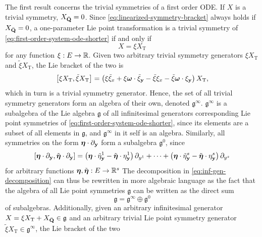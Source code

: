 The first result concerns the trivial symmetries of a first order ODE.
If \(X\) is a trivial symmetry, \(X_{\bar{\vb{Q}}} = 0\).
Since \cref{eq:linearized-symmetry-bracket} always holds if \(X_{\bar{\vb{Q}}} = 0\), a one-parameter Lie point transformation is a trivial symmetry of \cref{eq:first-order-system-ode-shorter} if and only if
\begin{equation}
  X = \xi X_{\text{T}}
\end{equation}
for any function \(\xi: E \to \mathbb{R}\).
Given two arbitrary trivial symmetry generators \(\xi X_{\text{T}}\) and \(\tilde{\xi} X_{\text{T}}\), the Lie bracket of the two is
\begin{equation}
  \comm{\xi X_{\text{T}}}{\tilde{\xi} X_{\text{T}}} = \left(\xi \tilde{\xi}_x + \xi \vb*{\omega} \cdot \tilde{\xi}_{\vb{y}} - \tilde{\xi} \xi_x - \tilde{\xi} \vb*{\omega} \cdot \xi_{\vb{y}} \right) X_{\text{T}},
\end{equation}
which in turn is a trivial symmetry generator.
Hence, the set of all trivial symmetry generators form an algebra of their own, denoted \(\mathfrak{g}^\infty\).
\(\mathfrak{g}^\infty\) is a subalgebra of the Lie algebra \(\mathfrak{g}\) of all infinitesimal generators corresponding Lie point symmetries of \cref{eq:first-order-system-ode-shorter}, since its elements are a subset of all elements in \(\mathfrak{g}\), and \(\mathfrak{g}^\infty\) in it self is an algebra.
Similarly, all symmetries on the form \(\vb*{\eta} \cdot \partial_{\vb{y}}\) form a subalgebra \(\mathfrak{g}^0\), since
\begin{equation}
  \comm{\vb*{\eta} \cdot \partial_{\vb{y}}}{\tilde{\vb*{\eta}} \cdot \partial_{\vb{y}}} = \left(\vb*{\eta} \cdot \tilde{\eta}^1_{\vb{y}} - \tilde{\vb*{\eta}} \cdot \eta^1_{\vb{y}}\right) \partial_{y^1} + \dots + \left(\vb*{\eta} \cdot \tilde{\eta}^s_{\vb{y}} - \tilde{\vb*{\eta}} \cdot \eta^s_{\vb{y}}\right) \partial_{y^s}
\end{equation}
for arbitrary functions \(\vb*{\eta}, \tilde{\vb*{\eta}}: E \to \mathbb{R}^s\)
The decomposition in \cref{eq:inf-gen-decomposition} can thus be rewritten in more algebraic language as the fact that the algebra of all Lie point symmetries \(\mathfrak{g}\) can be written as the direct sum
\begin{equation}
  \mathfrak{g} = \mathfrak{g}^\infty \oplus \mathfrak{g}^0
\end{equation}
of subalgebras.
Additionally, given an arbitrary infinitesimal generator \(X = \xi X_{\text{T}} + X_{\bar{\vb{Q}}} \in \mathfrak{g}\) and an arbitrary trivial Lie point symmetry generator \(\tilde{\xi} X_{\text{T}} \in \mathfrak{g}^\infty\), the Lie bracket of the two
